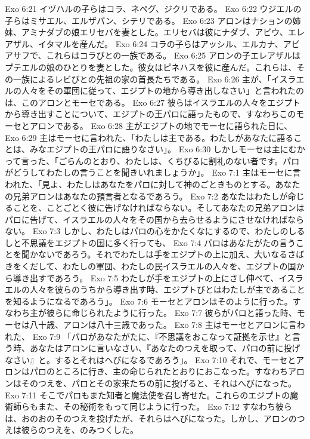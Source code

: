 Exo 6:21  イヅハルの子らはコラ、ネペグ、ジクリである。
Exo 6:22  ウジエルの子らはミサエル、エルザパン、シテリである。
Exo 6:23  アロンはナションの姉妹、アミナダブの娘エリセバを妻とした。エリセバは彼にナダブ、アビウ、エレアザル、イタマルを産んだ。
Exo 6:24  コラの子らはアッシル、エルカナ、アビアサフで、これらはコラびとの一族である。
Exo 6:25  アロンの子エレアザルはプテエルの娘のひとりを妻とした。彼女はピネハスを彼に産んだ。これらは、その一族によるレビびとの先祖の家の首長たちである。
Exo 6:26  主が、「イスラエルの人々をその軍団に従って、エジプトの地から導き出しなさい」と言われたのは、このアロンとモーセである。
Exo 6:27  彼らはイスラエルの人々をエジプトから導き出すことについて、エジプトの王パロに語ったもので、すなわちこのモーセとアロンである。
Exo 6:28  主がエジプトの地でモーセに語られた日に、
Exo 6:29  主はモーセに言われた、「わたしは主である。わたしがあなたに語ることは、みなエジプトの王パロに語りなさい」。
Exo 6:30  しかしモーセは主にむかって言った、「ごらんのとおり、わたしは、くちびるに割礼のない者です。パロがどうしてわたしの言うことを聞きいれましょうか」。
Exo 7:1  主はモーセに言われた、「見よ、わたしはあなたをパロに対して神のごときものとする。あなたの兄弟アロンはあなたの預言者となるであろう。
Exo 7:2  あなたはわたしが命じることを、ことごとく彼に告げなければならない。そしてあなたの兄弟アロンはパロに告げて、イスラエルの人々をその国から去らせるようにさせなければならない。
Exo 7:3  しかし、わたしはパロの心をかたくなにするので、わたしのしるしと不思議をエジプトの国に多く行っても、
Exo 7:4  パロはあなたがたの言うことを聞かないであろう。それでわたしは手をエジプトの上に加え、大いなるさばきをくだして、わたしの軍団、わたしの民イスラエルの人々を、エジプトの国から導き出すであろう。
Exo 7:5  わたしが手をエジプトの上にさし伸べて、イスラエルの人々を彼らのうちから導き出す時、エジプトびとはわたしが主であることを知るようになるであろう」。
Exo 7:6  モーセとアロンはそのように行った。すなわち主が彼らに命じられたように行った。
Exo 7:7  彼らがパロと語った時、モーセは八十歳、アロンは八十三歳であった。
Exo 7:8  主はモーセとアロンに言われた、
Exo 7:9  「パロがあなたがたに、『不思議をおこなって証拠を示せ』と言う時、あなたはアロンに言いなさい、『あなたのつえを取って、パロの前に投げなさい』と。するとそれはへびになるであろう」。
Exo 7:10  それで、モーセとアロンはパロのところに行き、主の命じられたとおりにおこなった。すなわちアロンはそのつえを、パロとその家来たちの前に投げると、それはへびになった。
Exo 7:11  そこでパロもまた知者と魔法使を召し寄せた。これらのエジプトの魔術師らもまた、その秘術をもって同じように行った。
Exo 7:12  すなわち彼らは、おのおのそのつえを投げたが、それらはへびになった。しかし、アロンのつえは彼らのつえを、のみつくした。
